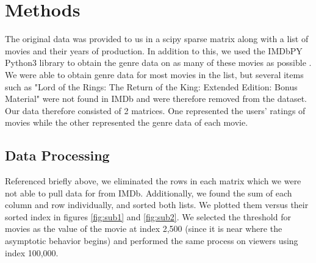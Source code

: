 \documentclass{article} %
\begin{document}
\section{Methods}

The original data was provided to us in a scipy sparse matrix \cite{scipy} along with a list of movies and their years of production. In addition to this, we used the IMDbPY Python3 library to obtain the genre data on as many of these movies as possible \cite{imdb}. We were able to obtain genre data for most movies in the list, but several items such as "Lord of the Rings: The Return of the King: Extended Edition: Bonus Material" were not found in IMDb and were therefore removed from the dataset. Our data therefore consisted of 2 matrices. One represented the users' ratings of movies while the other represented the genre data of each movie.

\subsection{Data Processing}

Referenced briefly above, we eliminated the rows in each matrix which we were not able to pull data for from IMDb. Additionally, we found the sum of each column and row individually, and sorted both lists. We plotted them versus their sorted index in figures \ref{fig:sub1} and \ref{fig:sub2}. We selected the threshold for movies as the value of the movie at index 2,500 (since it is near where the asymptotic behavior begins) and performed the same process on viewers using index 100,000.
\end{document}
